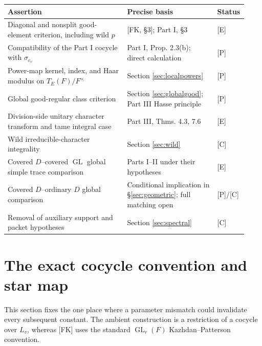 \documentclass[11pt]{article}
\newcommand{\GL}{\operatorname{GL}}
\theoremstyle{plain}
\theoremstyle{definition}
\begin{document}
\begin{center}\small
\begin{tabular}{@{}p{0.49\linewidth}p{0.37\linewidth}p{0.07\linewidth}@{}}
\toprule
Assertion & Precise basis & Status\\\midrule
Diagonal and nonsplit good-element criterion, including wild $p$ & [FK, \S3]; Part I, \S3 & [E]\\
Compatibility of the Part I cocycle with $\sigma_{c_v}$ & Part I, Prop. 2.3(b); direct calculation & [P]\\
Power-map kernel, index, and Haar modulus on $T_E(F)/F^\times$ & Section \ref{sec:localpowers} & [P]\\
Global good-regular class criterion & Section \ref{sec:globalgood}; Part III Hasse principle & [P]\\
Division-side unitary character transform and tame integral case & Part III, Thms. 4.3, 7.6 & [E]\\
Wild irreducible-character integrality & Section \ref{sec:wild} & [C]\\
Covered $D$--covered $\GL$ global simple trace comparison & Parts I--II under their hypotheses & [E]\\
Covered $D$--ordinary $D$ global comparison & Conditional implication in \S\ref{sec:geometric}; full matching open & [P]/[C]\\
Removal of auxiliary support and packet hypotheses & Section \ref{sec:spectral} & [C]\\
\bottomrule
\end{tabular}
\end{center}

\section{The exact cocycle convention and star map}\label{sec:cocycle}
This section fixes the one place where a parameter mismatch could
invalidate every subsequent constant.  The ambient construction is
a restriction of a cocycle over $L_v$, whereas [FK] uses the standard
$\GL_r(F)$ Kazhdan--Patterson convention.
\end{document}
